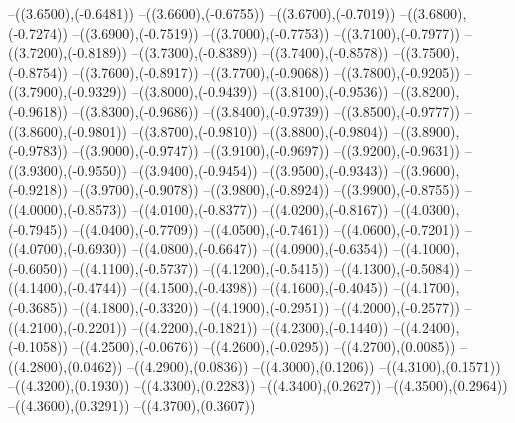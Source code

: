 {	--({\sx*(3.6500)},{\sy*(-0.6481)})
	--({\sx*(3.6600)},{\sy*(-0.6755)})
	--({\sx*(3.6700)},{\sy*(-0.7019)})
	--({\sx*(3.6800)},{\sy*(-0.7274)})
	--({\sx*(3.6900)},{\sy*(-0.7519)})
	--({\sx*(3.7000)},{\sy*(-0.7753)})
	--({\sx*(3.7100)},{\sy*(-0.7977)})
	--({\sx*(3.7200)},{\sy*(-0.8189)})
	--({\sx*(3.7300)},{\sy*(-0.8389)})
	--({\sx*(3.7400)},{\sy*(-0.8578)})
	--({\sx*(3.7500)},{\sy*(-0.8754)})
	--({\sx*(3.7600)},{\sy*(-0.8917)})
	--({\sx*(3.7700)},{\sy*(-0.9068)})
	--({\sx*(3.7800)},{\sy*(-0.9205)})
	--({\sx*(3.7900)},{\sy*(-0.9329)})
	--({\sx*(3.8000)},{\sy*(-0.9439)})
	--({\sx*(3.8100)},{\sy*(-0.9536)})
	--({\sx*(3.8200)},{\sy*(-0.9618)})
	--({\sx*(3.8300)},{\sy*(-0.9686)})
	--({\sx*(3.8400)},{\sy*(-0.9739)})
	--({\sx*(3.8500)},{\sy*(-0.9777)})
	--({\sx*(3.8600)},{\sy*(-0.9801)})
	--({\sx*(3.8700)},{\sy*(-0.9810)})
	--({\sx*(3.8800)},{\sy*(-0.9804)})
	--({\sx*(3.8900)},{\sy*(-0.9783)})
	--({\sx*(3.9000)},{\sy*(-0.9747)})
	--({\sx*(3.9100)},{\sy*(-0.9697)})
	--({\sx*(3.9200)},{\sy*(-0.9631)})
	--({\sx*(3.9300)},{\sy*(-0.9550)})
	--({\sx*(3.9400)},{\sy*(-0.9454)})
	--({\sx*(3.9500)},{\sy*(-0.9343)})
	--({\sx*(3.9600)},{\sy*(-0.9218)})
	--({\sx*(3.9700)},{\sy*(-0.9078)})
	--({\sx*(3.9800)},{\sy*(-0.8924)})
	--({\sx*(3.9900)},{\sy*(-0.8755)})
	--({\sx*(4.0000)},{\sy*(-0.8573)})
	--({\sx*(4.0100)},{\sy*(-0.8377)})
	--({\sx*(4.0200)},{\sy*(-0.8167)})
	--({\sx*(4.0300)},{\sy*(-0.7945)})
	--({\sx*(4.0400)},{\sy*(-0.7709)})
	--({\sx*(4.0500)},{\sy*(-0.7461)})
	--({\sx*(4.0600)},{\sy*(-0.7201)})
	--({\sx*(4.0700)},{\sy*(-0.6930)})
	--({\sx*(4.0800)},{\sy*(-0.6647)})
	--({\sx*(4.0900)},{\sy*(-0.6354)})
	--({\sx*(4.1000)},{\sy*(-0.6050)})
	--({\sx*(4.1100)},{\sy*(-0.5737)})
	--({\sx*(4.1200)},{\sy*(-0.5415)})
	--({\sx*(4.1300)},{\sy*(-0.5084)})
	--({\sx*(4.1400)},{\sy*(-0.4744)})
	--({\sx*(4.1500)},{\sy*(-0.4398)})
	--({\sx*(4.1600)},{\sy*(-0.4045)})
	--({\sx*(4.1700)},{\sy*(-0.3685)})
	--({\sx*(4.1800)},{\sy*(-0.3320)})
	--({\sx*(4.1900)},{\sy*(-0.2951)})
	--({\sx*(4.2000)},{\sy*(-0.2577)})
	--({\sx*(4.2100)},{\sy*(-0.2201)})
	--({\sx*(4.2200)},{\sy*(-0.1821)})
	--({\sx*(4.2300)},{\sy*(-0.1440)})
	--({\sx*(4.2400)},{\sy*(-0.1058)})
	--({\sx*(4.2500)},{\sy*(-0.0676)})
	--({\sx*(4.2600)},{\sy*(-0.0295)})
	--({\sx*(4.2700)},{\sy*(0.0085)})
	--({\sx*(4.2800)},{\sy*(0.0462)})
	--({\sx*(4.2900)},{\sy*(0.0836)})
	--({\sx*(4.3000)},{\sy*(0.1206)})
	--({\sx*(4.3100)},{\sy*(0.1571)})
	--({\sx*(4.3200)},{\sy*(0.1930)})
	--({\sx*(4.3300)},{\sy*(0.2283)})
	--({\sx*(4.3400)},{\sy*(0.2627)})
	--({\sx*(4.3500)},{\sy*(0.2964)})
	--({\sx*(4.3600)},{\sy*(0.3291)})
	--({\sx*(4.3700)},{\sy*(0.3607)})
}
